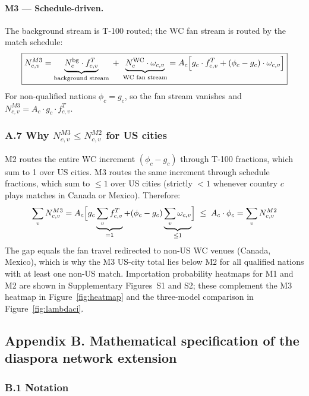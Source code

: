 \documentclass[12pt, a4paper]{article}
\begin{document}
\paragraph{M3 --- Schedule-driven.}
The background stream is T-100 routed; the WC fan stream is
routed by the match schedule:
\[
  \boxed{N_{c,v}^{M3}
    = \underbrace{N_c^{\text{bg}} \cdot f_{c,v}^{T}}_{\text{background stream}}
      \;+\;
      \underbrace{N_c^{\text{WC}} \cdot \omega_{c,v}}_{\text{WC fan stream}}
    = A_c \Bigl[
        g_c \cdot f_{c,v}^{T}
        + (\phi_c - g_c) \cdot \omega_{c,v}
      \Bigr]}
\]
For non-qualified nations $\phi_c = g_c$, so the fan stream
vanishes and $N_{c,v}^{M3} = A_c \cdot g_c \cdot f_{c,v}^{T}$.

\subsubsection*{A.7 Why $N_{c,v}^{M3} \leq N_{c,v}^{M2}$ for
US cities}

M2 routes the entire WC increment $(\phi_c - g_c)$ through T-100
fractions, which sum to 1 over US cities. M3 routes the same
increment through schedule fractions, which sum to $\leq 1$ over
US cities (strictly $<1$ whenever country $c$ plays matches in
Canada or Mexico). Therefore:
\[
  \sum_{v} N_{c,v}^{M3}
    = A_c \Bigl[
        g_c \underbrace{\sum_v f_{c,v}^T}_{=1}
        + (\phi_c - g_c)
          \underbrace{\sum_v \omega_{c,v}}_{\leq 1}
      \Bigr]
  \;\leq\;
  A_c \cdot \phi_c
    = \sum_v N_{c,v}^{M2}
\]
The gap equals the fan travel redirected to non-US WC venues
(Canada, Mexico), which is why the M3 US-city total lies below
M2 for all qualified nations with at least one non-US match.
Importation probability heatmaps for M1 and M2 are shown in
Supplementary Figures~S1 and S2; these complement the M3 heatmap
in Figure~\ref{fig:heatmap} and the three-model comparison in
Figure~\ref{fig:lambdaci}.

\newpage

\subsection*{Appendix B. Mathematical specification of the diaspora
network extension}

\subsubsection*{B.1 Notation}
\end{document}
